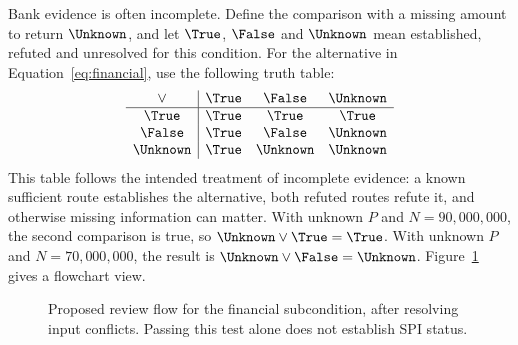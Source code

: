 Bank evidence is often incomplete. Define the comparison with a missing amount
to return $\Unknown$, and let $\True$, $\False$ and $\Unknown$ mean established,
refuted and unresolved for this condition. For the alternative in
Equation~\eqref{eq:financial}, use the following truth table:
\begin{equation}
\begin{array}{c|ccc}
\lor & \True & \False & \Unknown\\\hline
\True & \True & \True & \True\\
\False & \True & \False & \Unknown\\
\Unknown & \True & \Unknown & \Unknown
\end{array}
\label{eq:or}
\end{equation}
This table follows the intended treatment of incomplete evidence: a known
sufficient route establishes the alternative, both refuted routes refute it,
and otherwise missing information can matter. With unknown $P$ and
$N=90{,}000{,}000$, the second comparison is true, so
$\Unknown\lor\True=\True$. With unknown $P$ and $N=70{,}000{,}000$, the result
is $\Unknown\lor\False=\Unknown$. Figure~\ref{fig:financial-flow} gives a
flowchart view.


\begin{figure}[!htbp]
\centering
{}
\caption{Proposed review flow for the financial subcondition, after resolving
input conflicts. Passing this test alone does not establish SPI status.}
\label{fig:financial-flow}
\end{figure}

